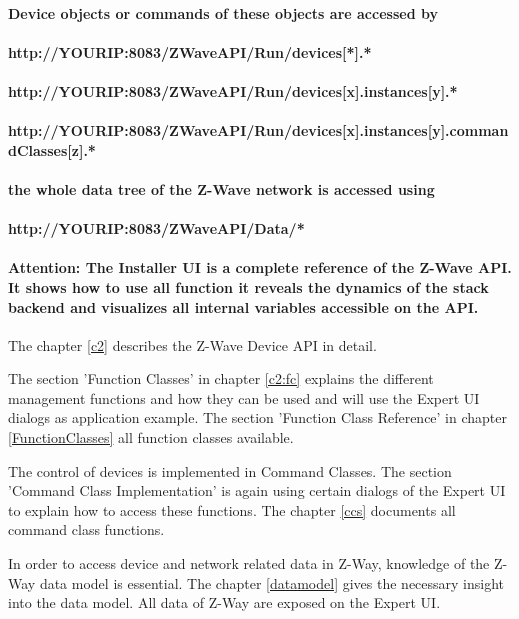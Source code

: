 \paragraph{Device objects or commands of these objects are accessed by} 
\paragraph{http://YOURIP:8083/ZWaveAPI/Run/devices[*].* }
\paragraph{http://YOURIP:8083/ZWaveAPI/Run/devices[x].instances[y].*}
\paragraph{http://YOURIP:8083/ZWaveAPI/Run/devices[x].instances[y].commandClasses[z].*} 
\paragraph{the whole data tree of the Z-Wave network is accessed using}  
\paragraph{http://YOURIP:8083/ZWaveAPI/Data/*}

\paragraph{
\textbf{Attention: The Installer UI is a complete reference of the Z-Wave API. It shows how 
to use all function it reveals the dynamics of the stack backend and visualizes all 
internal variables accessible on the API. }}

The chapter \ref{c2} describes the Z-Wave Device API in detail.

The section 'Function Classes' in chapter \ref{c2:fc} explains the different management 
functions and how they  can be used and will use the Expert UI dialogs as application example. The 
section 'Function Class Reference' in chapter \ref{FunctionClasses} all function 
classes available.

The control of devices  is implemented in Command Classes. The section 'Command Class 
Implementation' is again using certain dialogs of the Expert UI to explain how to access 
these functions. The chapter \ref{ccs} documents all 
command class functions. 

In order to access device and network related data in Z-Way, knowledge of the Z-Way 
data model is essential. The chapter \ref{datamodel} gives the necessary insight 
into the data model. All data of Z-Way are exposed on the Expert UI.

